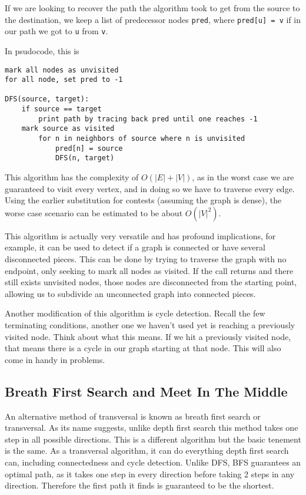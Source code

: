 \documentclass[12 pt, twoside] {article}
\begin{document}
{If we are looking to recover the path the algorithm took to get from the source
to the destination, we keep a list of predecessor nodes \texttt{pred}, where
\texttt{pred[u] = v} if in our path we got to \texttt{u} from \texttt{v}.

In psudocode, this is
\begin{verbatim}
mark all nodes as unvisited
for all node, set pred to -1

DFS(source, target):
    if source == target
        print path by tracing back pred until one reaches -1
    mark source as visited
        for n in neighbors of source where n is unvisited
            pred[n] = source
            DFS(n, target)
\end{verbatim}

This algorithm has the complexity of $O(|E| + |V|)$, as in the worst case we are
guaranteed to visit every vertex, and in doing so we have to traverse every
edge. Using the earlier substitution for contests (assuming the graph is dense),
the worse case scenario can be estimated to be about $O(|V|^2)$.

This algorithm is actually very versatile and has profound implications, for
example, it can be used to detect if a graph is connected or have several
disconnected pieces. This can be done by trying to traverse the graph with no
endpoint, only seeking to mark all nodes as visited. If the call returns and
there still exists unvisited nodes, those nodes are disconnected from the
starting point, allowing us to subdivide an unconnected graph into connected
pieces.

Another modification of this algorithm is cycle detection. Recall the few
terminating conditions, another one we haven't used yet is reaching a previously
visited node. Think about what this means. If we hit a previously visited node,
that means there is a cycle in our graph starting at that node. This will also
come in handy in problems.

\subsection*{Breath First Search and Meet In The Middle}

An alternative method of transversal is known as breath first search or
transversal. As its name suggests, unlike depth first search this method takes
one step in all possible directions. This is a different algorithm but the basic
tenement is the same. As a transversal algorithm, it can do everything depth
first search can, including connectedness and cycle detection. Unlike DFS, BFS
guarantees an optimal path, as it takes one step in every direction before
taking 2 steps in any direction. Therefore the first path it finds is guaranteed
to be the shortest.

}
\end{document}
